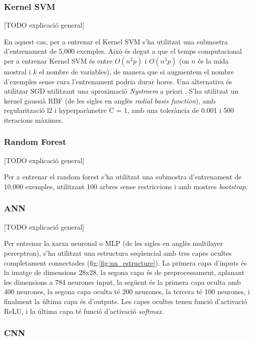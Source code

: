 \documentclass[12pt, spanish]{article}
\begin{document}
\subsubsection{Kernel SVM}

[TODO explicació general]

En aquest cas, per a entrenar el Kernel SVM s'ha utilitzat una submostra d'entrenament de 5,000 exemples. Això és degut a que el temps computacional per a entrenar Kernel SVM és entre $O(n^2 p)$  i $O(n^3 p)$ (on $n$ és la mida mostral i $k$ el nombre de variables), de manera que si augmentem el nombre d'exemples sense cura l'entrenament podria durar hores. Una alternativa és utilitzar SGD utilitzant una aproximació \textit{Nystroem} a priori \cite{sklearn}. S'ha utilitzat un kernel gaussià RBF (de les sigles en anglès \textit{radial basis function}), amb regularització l2 i hyperparàmetre C = 1, amb una tolerància de 0.001 i 500 iteracions màximes. 

\subsubsection{Random Forest}

[TODO explicació general]

Per a entrenar el random forest s'ha utilitzat una submostra d'entrenament de 10,000 exemples, utilitzant 100 arbres sense restriccions i amb mostres \textit{bootstrap}. 

\subsubsection{ANN}

[TODO explicació general]

Per entrenar la xarxa neuronal o MLP (de les sigles en anglès multilayer perceptron), s'ha utilitzat una estructura seqüencial amb tres capes ocultes completament connectades (fig:\ref{fig:nn_estructure}). La primera capa d'inputs és la imatge de dimensions 28x28, la segona capa és de preprocessament, aplanant les dimensions a 784 neurones input, la següent és la primera capa oculta amb 400 neurones, la segona capa oculta té 200 neurones, la tercera té 100 neurones, i finalment la última capa és d'outputs. Les capes ocultes tenen funció d'activació ReLU, i la última capa té funció d'activació \textit{softmax}. 




\subsubsection{CNN}
\end{document}
